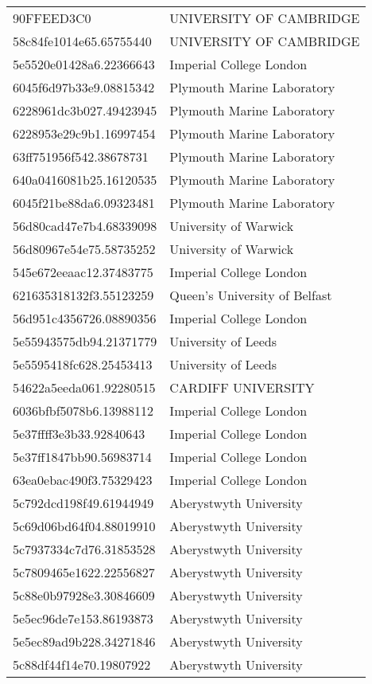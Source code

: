 \begin{tabular}{ll}
90FFEED3C0 & UNIVERSITY OF CAMBRIDGE \\
58c84fe1014e65.65755440 & UNIVERSITY OF CAMBRIDGE \\
5e5520e01428a6.22366643 & Imperial College London \\
6045f6d97b33e9.08815342 & Plymouth Marine Laboratory \\
6228961dc3b027.49423945 & Plymouth Marine Laboratory \\
6228953e29c9b1.16997454 & Plymouth Marine Laboratory \\
63ff751956f542.38678731 & Plymouth Marine Laboratory \\
640a0416081b25.16120535 & Plymouth Marine Laboratory \\
6045f21be88da6.09323481 & Plymouth Marine Laboratory \\
56d80cad47e7b4.68339098 & University of Warwick \\
56d80967e54e75.58735252 & University of Warwick \\
545e672eeaac12.37483775 & Imperial College London \\
621635318132f3.55123259 & Queen's University of Belfast \\
56d951c4356726.08890356 & Imperial College London \\
5e55943575db94.21371779 & University of Leeds \\
5e5595418fc628.25453413 & University of Leeds \\
54622a5eeda061.92280515 & CARDIFF UNIVERSITY \\
6036bfbf5078b6.13988112 & Imperial College London \\
5e37ffff3e3b33.92840643 & Imperial College London \\
5e37ff1847bb90.56983714 & Imperial College London \\
63ea0ebac490f3.75329423 & Imperial College London \\
5c792dcd198f49.61944949 & Aberystwyth University \\
5c69d06bd64f04.88019910 & Aberystwyth University \\
5c7937334c7d76.31853528 & Aberystwyth University \\
5c7809465e1622.22556827 & Aberystwyth University \\
5c88e0b97928e3.30846609 & Aberystwyth University \\
5e5ec96de7e153.86193873 & Aberystwyth University \\
5e5ec89ad9b228.34271846 & Aberystwyth University \\
5c88df44f14e70.19807922 & Aberystwyth University \\

\end{tabular}
